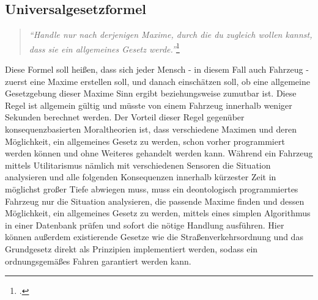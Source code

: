 \documentclass[a4paper, 12pt, openany]{book}
\begin{document}
            \subsection{Universalgesetzformel}
            \begin{quote}
                \centering
                \textit{\enquote{Handle nur nach derjenigen Maxime, durch die du zugleich wollen kannst, dass sie ein allgemeines Gesetz werde.}}\footcite[44]{kirchmann1870grundlegung}
            \end{quote}
            Diese Formel soll heißen, dass sich jeder Mensch - in diesem Fall auch Fahrzeug - zuerst eine Maxime erstellen soll, und danach einschätzen soll, ob eine allgemeine Gesetzgebung dieser Maxime Sinn ergibt beziehungsweise zumutbar ist. Diese Regel ist allgemein gültig und müsste von einem Fahrzeug innerhalb weniger Sekunden berechnet werden. Der Vorteil dieser Regel gegenüber konsequenzbasierten Moraltheorien ist, dass verschiedene Maximen und deren Möglichkeit, ein allgemeines Gesetz zu werden, schon vorher programmiert werden können und ohne Weiteres gehandelt werden kann. Während ein Fahrzeug mittels Utilitarismus nämlich mit verschiedenen Sensoren die Situation analysieren und alle folgenden Konsequenzen innerhalb kürzester Zeit in möglichst großer Tiefe abwiegen muss, muss ein deontologisch programmiertes Fahrzeug nur die Situation analysieren, die passende Maxime finden und dessen Möglichkeit, ein allgemeines Gesetz zu werden, mittels eines simplen Algorithmus in einer Datenbank prüfen und sofort die nötige Handlung ausführen. Hier können außerdem existierende Gesetze wie die Straßenverkehrsordnung und das Grundgesetz direkt als Prinzipien implementiert werden, sodass ein ordnungsgemäßes Fahren garantiert werden kann.
            
\end{document}
